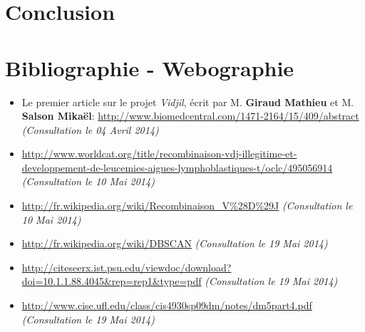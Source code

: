 \documentclass[12pt]{report}
\begin{document}
\begin{spacing}{1.2}
\chapter{Conclusion}

\chapter*{Bibliographie - Webographie}


\begin{itemize}
\item{Le premier article sur le projet \textit{Vidjil}, écrit par M. \textbf{Giraud Mathieu} et M. \textbf{Salson Mikaël}: \url{http://www.biomedcentral.com/1471-2164/15/409/abstract} \textit{(Consultation le 04 Avril 2014)}}
\item{\url{http://www.worldcat.org/title/recombinaison-vdj-illegitime-et-developpement-de-leucemies-aigues-lymphoblastiques-t/oclc/495056914} \textit{(Consultation le 10 Mai 2014)}}
\item{\url{http://fr.wikipedia.org/wiki/Recombinaison_V%28D%29J} \textit{(Consultation le 10 Mai 2014)}}
\item{\url{http://fr.wikipedia.org/wiki/DBSCAN} \textit{(Consultation le 19 Mai 2014)}}
\item{\url{http://citeseerx.ist.psu.edu/viewdoc/download?doi=10.1.1.88.4045&rep=rep1&type=pdf} \textit{(Consultation le 19 Mai 2014)}}
\item{\url{http://www.cise.ufl.edu/class/cis4930sp09dm/notes/dm5part4.pdf} \textit{(Consultation le 19 Mai 2014)}}
\end{itemize}

\end{spacing}
\end{document}
